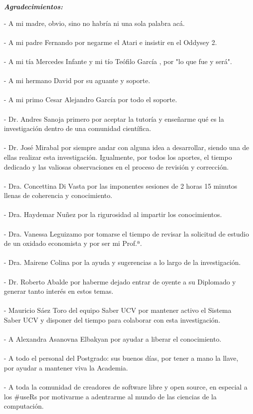 \documentclass[
  12pt,
  openany]{book}
\begin{document}
\newpage
\begin{center}
\large{\textbf{\emph{\Huge{Agradecimientos:}}}}
\end{center}
\thispagestyle{empty}
\vspace*{2cm}
\thispagestyle{empty}

- A mi madre, obvio, sino no habría ni una sola palabra acá.\\\\
- A mi padre Fernando por negarme el Atari e insistir en el Oddysey 2.\\\\
- A mi tía Mercedes Infante y mi tío Teófilo García \textdagger, por "lo que fue y será".\\\\
- A mi hermano David por su aguante y soporte.\\\\
- A mi primo Cesar Alejandro García por todo el soporte.\\\\
- Dr. Andres Sanoja primero por aceptar la tutoría y enseñarme qué es la investigación dentro de una comunidad científica.\\\\
- Dr. José Mirabal por siempre andar con alguna idea a desarrollar, siendo una de ellas realizar esta investigación. Igualmente, por todos los aportes, el tiempo dedicado y las valiosas observaciones en el proceso de revisión y corrección.\\\\
- Dra. Concettina Di Vasta por las imponentes sesiones de 2 horas 15 minutos llenas de coherencia y conocimiento.\\\\
- Dra. Haydemar Nuñez por la rigurosidad al impartir los conocimientos.\\\\
- Dra. Vanessa Leguizamo por tomarse el tiempo de revisar la solicitud de estudio de un oxidado economista y por ser mi Prof.ª.\\\\
- Dra. Mairene Colina por la ayuda y sugerencias a lo largo de la investigación.\\\\
- Dr. Roberto Abalde por haberme dejado entrar de oyente a su Diplomado y generar tanto interés en estos temas.\\\\
- Mauricio Sáez Toro del equipo Saber UCV por mantener activo el Sistema Saber UCV y disponer del tiempo para colaborar con esta investigación.\\\\
- A Alexandra Asanovna Elbakyan por ayudar a liberar el conocimiento.\\\\
- A todo el personal del Postgrado: sus buenos días, por tener a mano la llave, por ayudar a mantener viva la Academia.\\\\
- A toda la comunidad de creadores de software libre y open source, en especial a los \#useRs por motivarme a adentrarme al mundo de las ciencias de la computación.\\\\
\end{document}
